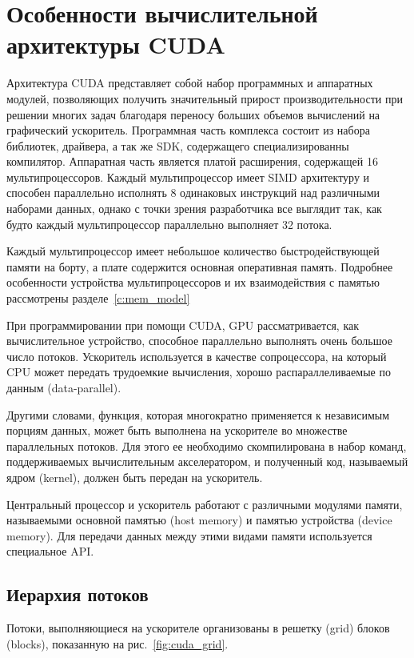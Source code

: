 \chapter{Особенности вычислительной архитектуры CUDA}

Архитектура CUDA представляет собой набор программных и аппаратных модулей, позволяющих получить значительный прирост производительности при решении многих задач благодаря переносу больших объемов вычислений на графический ускоритель. Программная часть комплекса состоит из набора библиотек, драйвера, а так же SDK, содержащего специализированны компилятор. Аппаратная часть является платой расширения, содержащей 16 мультипроцессоров. Каждый мультипроцессор имеет SIMD архитектуру и способен параллельно исполнять 8 одинаковых инструкций над различными наборами данных, однако с точки зрения разработчика все выглядит так, как будто каждый мультипроцессор параллельно выполняет 32 потока. 

Каждый мультипроцессор имеет небольшое количество быстродействующей памяти на борту, а плате содержится основная оперативная память. Подробнее особенности устройства мультипроцессоров и их взаимодействия с памятью рассмотрены разделе~\ref{c:mem_model}

При программировании при помощи CUDA, GPU рассматривается, как вычислительное устройство, способное параллельно выполнять очень большое число потоков. Ускоритель используется в качестве сопроцессора, на который CPU может передать трудоемкие вычисления, хорошо распараллеливаемые по данным (data-parallel).

Другими словами, функция, которая многократно применяется к независимым порциям данных, может быть выполнена на ускорителе во множестве параллельных потоков. Для этого ее необходимо скомпилирована в набор команд, поддерживаемых вычислительным акселератором, и полученный код, называемый ядром (kernel), должен быть передан на ускоритель.

Центральный процессор и ускоритель работают с различными модулями памяти, называемыми основной памятью (host memory) и памятью устройства (device memory). Для передачи данных между этими видами памяти используется специальное API.

\section{Иерархия потоков}
Потоки, выполняющиеся на ускорителе организованы в решетку (grid) блоков (blocks), показанную на рис.~\ref{fig:cuda_grid}.

